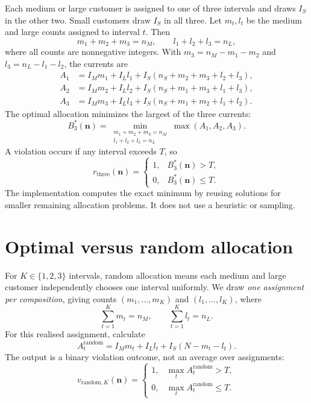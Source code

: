 \documentclass[11pt,a4paper]{article}
\begin{document}
Each medium or large customer is assigned to one of three intervals and
draws \(I_S\) in the other two. Small customers draw \(I_S\) in all three.
Let \(m_t,l_t\) be the medium and large counts assigned to interval \(t\).
Then
\begin{equation}
    m_1+m_2+m_3=n_M,\qquad l_1+l_2+l_3=n_L,
\end{equation}
where all counts are nonnegative integers. With
\(m_3=n_M-m_1-m_2\) and \(l_3=n_L-l_1-l_2\), the currents are
\begin{align}
    A_1&=I_Mm_1+I_Ll_1+I_S(n_S+m_2+m_3+l_2+l_3),\\
    A_2&=I_Mm_2+I_Ll_2+I_S(n_S+m_1+m_3+l_1+l_3),\\
    A_3&=I_Mm_3+I_Ll_3+I_S(n_S+m_1+m_2+l_1+l_2).
\end{align}
The optimal allocation minimizes the largest of the three currents:
\begin{equation}
    B_3^*(\boldsymbol n)=
    \min_{\substack{m_1+m_2+m_3=n_M\\l_1+l_2+l_3=n_L}}
    \max(A_1,A_2,A_3).
\end{equation}
A violation occurs if any interval exceeds \(T\), so
\begin{equation}
    r_{\mathrm{three}}(\boldsymbol n)=
    \begin{cases}
        1,&B_3^*(\boldsymbol n)>T,\\
        0,&B_3^*(\boldsymbol n)\leq T.
    \end{cases}
\end{equation}
The implementation computes the exact minimum by reusing solutions for
smaller remaining allocation problems. It does not use a heuristic or sampling.

\section{Optimal versus random allocation}

For \(K\in\{1,2,3\}\) intervals, random allocation means each medium and
large customer independently chooses one interval uniformly. We draw
\emph{one assignment per composition}, giving counts
\((m_1,\ldots,m_K)\) and \((l_1,\ldots,l_K)\), where
\begin{equation}
    \sum_{t=1}^K m_t=n_M,\qquad \sum_{t=1}^K l_t=n_L.
\end{equation}
For this realised assignment, calculate
\begin{equation}
    A_t^{\mathrm{random}}=I_Mm_t+I_Ll_t+I_S(N-m_t-l_t).
\end{equation}
The output is a binary violation outcome, not an average over assignments:
\begin{equation}
    v_{\mathrm{random},K}(\boldsymbol n)=
    \begin{cases}
        1,&\max_t A_t^{\mathrm{random}}>T,\\
        0,&\max_t A_t^{\mathrm{random}}\leq T.
    \end{cases}
\end{equation}
\end{document}
